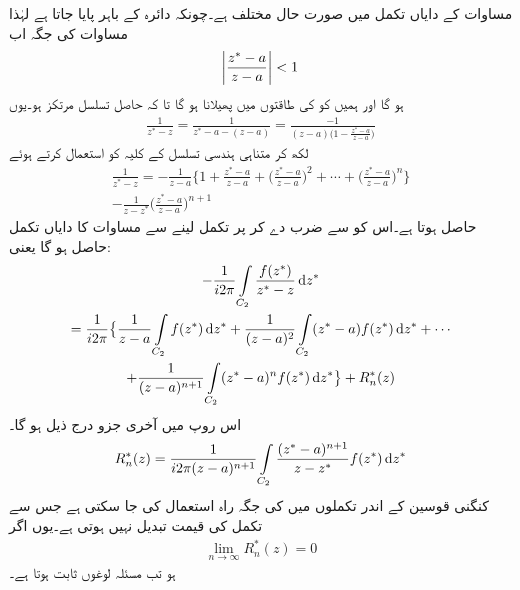 مساوات  کے دایاں تکمل میں صورت حال مختلف ہے۔چونکہ  دائرہ  کے باہر پایا جاتا ہے لہٰذا مساوات  کی جگہ اب
\begin{align}\label{مساوات_ٹیلر_اکائی_سے_کم}
\abs{\frac{z^*-a}{z-a}}<1
\end{align}
ہو گا اور ہمیں  کو  کی طاقتوں میں پھیلانا ہو گا تا کہ حاصل تسلسل مرتکز ہو۔یوں 
\begin{align*}
\frac{1}{z^*-z}=\frac{1}{z^*-a-(z-a)}=\frac{-1}{(z-a)\big(1-\frac{z^*-a}{z-a}\big)}
\end{align*}
لکھ کر متناہی ہندسی تسلسل کے کلیہ کو استعمال کرتے ہوئے 
\begin{multline*}
\frac{1}{z^*-z}=-\frac{1}{z-a}\big \{1+\frac{z^*-a}{z-a}+\big(\frac{z^*-a}{z-a}\big)^2 +\cdots+\big(\frac{z^*-a}{z-a}\big)^n\big \}\\
-\frac{1}{z-z^*}\big(\frac{z^*-a}{z-a}\big)^{n+1}
\end{multline*}
حاصل ہوتا ہے۔اس کو  سے ضرب دے کر  پر تکمل لینے سے مساوات  کا دایاں تکمل حاصل ہو گا یعنی:
\begin{multline*}
-\frac{1}{i2\pi}\int\limits_{C_2} \frac{f(z^*)}{z^*-z}\dif z^*\\
=\frac{1}{i2\pi}\big\{\frac{1}{z-a}\int\limits_{C_2}f(z^*)\dif z^*+\frac{1}{(z-a)^2}\int\limits_{C_2} (z^*-a)f(z^*)\dif z^*+\cdots \\
+\frac{1}{(z-a)^{n+1}}\int\limits_{C_2} (z^*-a)^nf(z^*)\dif z^* \big \}+R^*_n(z)
\end{multline*} 
اس روپ میں آخری جزو درج ذیل ہو گا۔
\begin{align}\label{مساوات_ٹیلر_لوغوں_باقی_الف}
R^*_n(z)=\frac{1}{i2\pi(z-a)^{n+1}}\int\limits_{C_2} \frac{(z^*-a)^{n+1}}{z-z^*}f(z^*)\dif z^*
\end{align}
کنگنی قوسین کے اندر  تکملوں میں  کی جگہ راہ  استعمال کی جا سکتی ہے جس سے تکمل کی قیمت تبدیل نہیں ہوتی ہے۔یوں اگر 
\begin{align}\label{مساوات_ٹیلر_لوغوں_باقی_ب}
\lim_{n\to \infty}R^*_n(z) =0
\end{align}
ہو تب مسئلہ لوغوں ثابت ہوتا ہے۔ 


